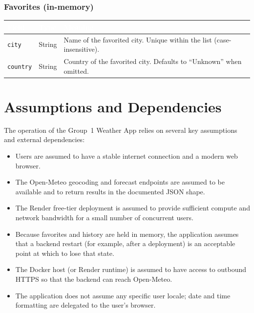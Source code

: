\documentclass[11pt,letterpaper]{article}
\newcommand{\thead}[1]{\textcolor{white}{\bfseries #1}}
\begin{document}
\subsubsection*{Favorites (in-memory)}
\begin{tabularx}{\linewidth}{| L{1.7in} | L{1.5in} | Y |}
\hline
{}\thead{Field} & \thead{Type} & \thead{Meaning} \\
\hline
\texttt{city}    & String & Name of the favorited city. Unique within the list (case-insensitive). \\ \hline
{}\texttt{country} & String & Country of the favorited city. Defaults to ``Unknown'' when omitted. \\ \hline
\end{tabularx}

\section{Assumptions and Dependencies}
The operation of the Group~1 Weather App relies on several key assumptions and external dependencies:
\begin{itemize}
  \item Users are assumed to have a stable internet connection and a modern web browser.
  \item The Open-Meteo geocoding and forecast endpoints are assumed to be available and to return results in the documented JSON shape.
  \item The Render free-tier deployment is assumed to provide sufficient compute and network bandwidth for a small number of concurrent users.
  \item Because favorites and history are held in memory, the application assumes that a backend restart (for example, after a deployment) is an acceptable point at which to lose that state.
  \item The Docker host (or Render runtime) is assumed to have access to outbound HTTPS so that the backend can reach Open-Meteo.
  \item The application does not assume any specific user locale; date and time formatting are delegated to the user's browser.
\end{itemize}

\end{document}
